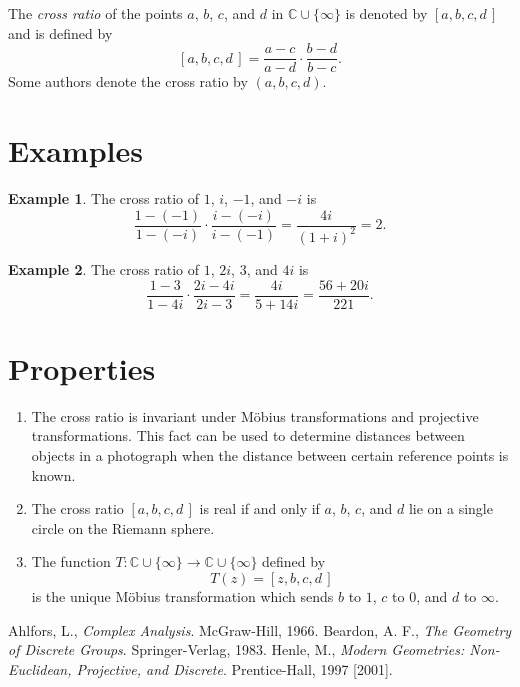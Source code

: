 \documentclass[12pt]{article}
\theoremstyle{definition}
\newtheorem{example}{Example}
\begin{document}
The \emph{cross ratio} of the points $a$, $b$, $c$, and $d$ in $\mathbb{C}\cup\{\infty\}$ is denoted by $[a, b, c, d\,]$ and is defined by
\[
  [a, b, c, d\,] = \frac{a-c}{a-d}\cdot\frac{b-d}{b-c}.
\]
Some authors denote the cross ratio by $(a, b, c, d)$.

\section*{Examples}

\begin{example}
The cross ratio of $1$, $i$, $-1$, and $-i$ is
\[
\frac{1-(-1)}{1-(-i)}\cdot\frac{i-(-i)}{i-(-1)}
=\frac{4i}{(1+i)^2}=2.
\]
\end{example}

\begin{example}
The cross ratio of $1$, $2i$, $3$, and $4i$ is
\[
\frac{1-3}{1-4i}\cdot\frac{2i-4i}{2i-3}
=\frac{4i}{5+14i}
=\frac{56+20i}{221}.
\]
\end{example}

\section*{Properties}

\begin{enumerate}
\item
The cross ratio is invariant under M\"obius transformations and projective transformations.  This fact can be used to determine distances between objects in a photograph when the distance between certain reference points is known.

\item
The cross ratio $[a, b, c, d\,]$ is real if and only if $a$, $b$, $c$, and $d$ lie on a single circle on the Riemann sphere.

\item
The function $T:\mathbb{C}\cup\lbrace \infty \rbrace \to\mathbb{C}\cup\lbrace \infty\rbrace$ defined by
\[
T(z) = [z, b, c, d\,]
\]
is the unique M\"obius transformation which sends $b$ to $1$, $c$ to $0$, and $d$ to $\infty$.
\end{enumerate}

\begin{thebibliography}{1}
Ahlfors, L., \emph{Complex Analysis}.  McGraw-Hill, 1966. 
Beardon, A. F., \emph{The Geometry of Discrete Groups}.  Springer-Verlag, 1983.
Henle, M., \emph{Modern Geometries: Non-Euclidean, Projective, and Discrete}.  Prentice-Hall, 1997 [2001].
\end{thebibliography}
\end{document}
